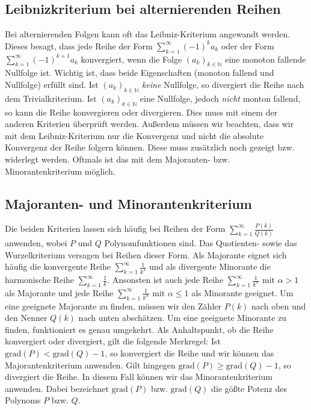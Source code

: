 \documentclass[fontsize=9pt,
               parskip=half-,
               DIV=14,
               listof=chapterentry,
               tocflat]{scrbook}
\begin{document}
\subsection{Leibnizkriterium bei alternierenden Reihen}

Bei alternierenden Folgen kann oft das Leibniz-Kriterium angewandt werden. Dieses besagt, dass jede Reihe der Form $\sum _{k=1}^{\infty }(-1)^{k}a_{k}$ oder der Form $\sum _{k=1}^{\infty }(-1)^{k+1}a_{k}$ konvergiert, wenn die Folge $(a_{k})_{k\in \mathbb {N} }$ eine monoton fallende Nullfolge ist. Wichtig ist, dass beide Eigenschaften (monoton fallend und Nullfolge) erfüllt sind. Ist $(a_{k})_{k\in \mathbb {N} }$ \emph{keine} Nullfolge, so divergiert die Reihe nach dem Trivialkriterium. Ist $(a_{k})_{k\in \mathbb {N} }$ eine Nullfolge, jedoch \emph{nicht} monton fallend, so kann die Reihe konvergieren oder divergieren. Dies muss mit einem der anderen Kriterien überprüft werden. Außerdem müssen wir beachten, dass wir mit dem Leibniz-Kriterium nur die Konvergenz und nicht die absolute Konvergenz der Reihe folgern können. Diese muss zusätzlich noch gezeigt bzw. widerlegt werden. Oftmals ist das mit dem Majoranten- bzw. Minorantenkriterium möglich.

\subsection{Majoranten- und Minorantenkriterium}

Die beiden Kriterien lassen sich häufig bei Reihen der Form $\sum _{k=1}^{\infty }{\tfrac {P(k)}{Q(k)}}$ anwenden, wobei $P$ und $Q$ Polynomfunktionen sind. Das Quotienten- sowie das Wurzelkriterium versagen bei Reihen dieser Form. Als Majorante eignet sich häufig die konvergente Reihe $\sum _{k=1}^{\infty }{\tfrac {1}{k^{2}}}$ und als divergente Minorante die harmonische Reihe $\sum _{k=1}^{\infty }{\tfrac {1}{k}}$. Ansonsten ist auch jede Reihe $\sum _{k=1}^{\infty }{\tfrac {1}{k^{\alpha }}}$ mit $\alpha >1$ als Majorante und jede Reihe $\sum _{k=1}^{\infty }{\tfrac {1}{k^{\alpha }}}$ mit $\alpha \leq 1$ als Minorante geeignet. Um eine geeignete Majorante zu finden, müssen wir den Zähler $P(k)$ nach oben und den Nenner $Q(k)$ nach unten abschätzen. Um eine geeignete Minorante zu finden, funktioniert es genau umgekehrt. Als Anhaltspunkt, ob die Reihe konvergiert oder divergiert, gilt die folgende Merkregel: Ist ${\text{grad}}(P)<{\text{grad}}(Q)-1$, so konvergiert die Reihe und wir können das Majorantenkriterium anwenden. Gilt hingegen ${\text{grad}}(P)\geq {\text{grad}}(Q)-1$, so divergiert die Reihe. In diesem Fall können wir das Minorantenkriterium anwenden. Dabei bezeichnet ${\text{grad}}(P)$ bzw. ${\text{grad}}(Q)$ die gößte Potenz des Polynoms $P$ bzw. $Q$.
\end{document}
